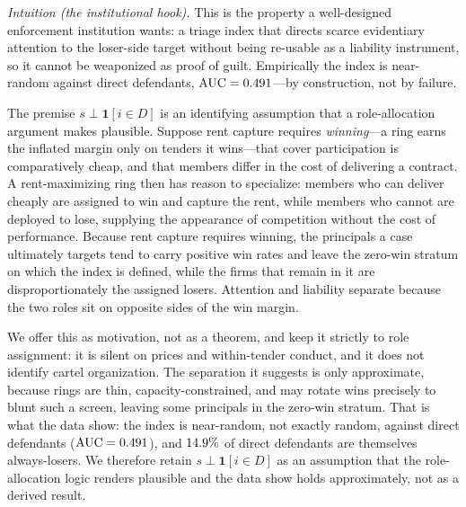 \noindent\emph{Intuition (the institutional hook).} This is the
property a well-designed enforcement institution wants: a triage
index that directs scarce evidentiary attention to the loser-side
target without being re-usable as a liability instrument, so it
cannot be weaponized as proof of guilt. Empirically the index is
near-random against direct defendants,
$\mathrm{AUC}=0.491$---by construction, not by failure.

The premise $s\perp\mathbf{1}[i\in D]$ is an identifying
assumption that a role-allocation argument makes plausible.
Suppose rent capture requires \emph{winning}---a ring earns the
inflated margin only on tenders it wins---that cover
participation is comparatively cheap, and that members differ in
the cost of delivering a contract. A rent-maximizing ring then has
reason to specialize: members who can deliver cheaply are assigned
to win and capture the rent, while members who cannot are deployed
to lose, supplying the appearance of competition without the cost
of performance. Because rent capture requires winning, the
principals a case ultimately targets tend to carry positive win
rates and leave the zero-win stratum on which the index is
defined, while the firms that remain in it are disproportionately
the assigned losers. Attention and liability separate because the
two roles sit on opposite sides of the win margin.

We offer this as motivation, not as a theorem, and keep it
strictly to role assignment: it is silent on prices and
within-tender conduct, and it does not identify cartel
organization. The separation it suggests is only approximate,
because rings are thin, capacity-constrained, and may rotate wins
precisely to blunt such a screen, leaving some principals in the
zero-win stratum. That is what the data show: the index is
near-random, not exactly random, against direct defendants
($\mathrm{AUC}=0.491$), and $14.9\%$ of
direct defendants are themselves always-losers. We therefore
retain $s\perp\mathbf{1}[i\in D]$ as an assumption that the
role-allocation logic renders plausible and the data show holds
approximately, not as a derived result.

